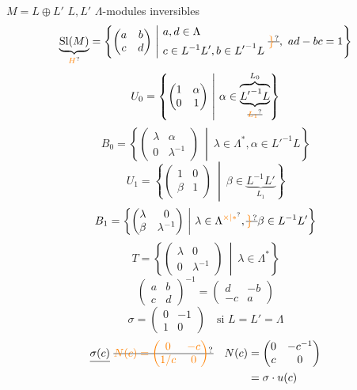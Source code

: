 $M=L\oplus L'$\qquad {} $L,L'$ $\Lambda$-modules inversibles
\[\underbrace{\mathrm{Sl}(M)}_{\unsure{H}}=\left\{\begin{pmatrix}a&b\\c&d\end{pmatrix}\ \middle|\ \begin{aligned}&a,d\in\Lambda\\&c\in L^{-1}L',b\in{L'}^{-1}L\end{aligned}\ \deleted{\unsure{\big\}}},\ ad-bc=1\right\}\]
\[U_0=\left\{\begin{pmatrix}1&\alpha\\0&1\end{pmatrix}\ \middle|\ \alpha\in\overset{L_0}{\overbrace{\underbrace{{L'}^{-1}L}_{\deleted{\unsure{L_1}}}}}\right\}\]
\[B_0=\left\{\begin{pmatrix}\lambda&\alpha\\0&\lambda^{-1}\end{pmatrix}\ \middle|\ \lambda\in\Lambda^*,\alpha\in{L'}^{-1}L\right\}\]
\[U_1=\left\{\begin{pmatrix}1&0\\\beta&1\end{pmatrix}\ \middle|\ \beta\in\underbrace{L^{-1}L'}_{L_1}\right\}\]
\[B_1=\left\{\begin{pmatrix}\lambda&0\\\beta&\lambda^{-1}\end{pmatrix}\ \middle|\ \lambda\in\Lambda^{\unsure{\times|\ast}},\deleted{\unsure{\big\}}}\beta\in L^{-1}L'\right\}\]
\[T=\left\{\begin{pmatrix}\lambda&0\\0&\lambda^{-1}\end{pmatrix}\ \middle|\ \lambda\in\Lambda^*\right\}\]
\[\begin{pmatrix}a&b\\c&d\end{pmatrix}^{-1}=\begin{pmatrix}d&-b\\-c&a\end{pmatrix}\]
\[\sigma=\begin{pmatrix}0&-1\\1&0\end{pmatrix}\quad\text{si }L=L'=\Lambda\]
\[\begin{aligned}
\deleted{\sigma(c)}\ \deleted{\unsure{N(c)=\begin{pmatrix}0&-c\\1/c&0\end{pmatrix}}}\quad N(c)&=\begin{pmatrix}0&-c^{-1}\\c&0\end{pmatrix}\\&=\sigma\cdot u(c)
\end{aligned}\]

